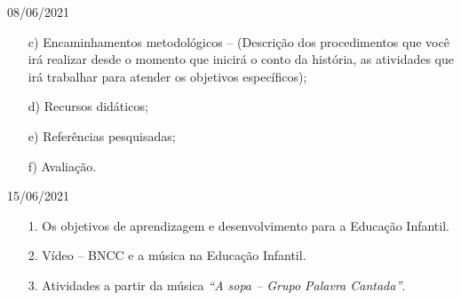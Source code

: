 \documentclass{SchoolBook}
\begin{document}
\begin{day}{08/06/2021}
\begin{enumerate}
            \item[c)] Encaminhamentos metodológicos -- (Descrição dos procedimentos que você irá realizar desde o momento que inicirá o conto da história, as atividades que irá trabalhar para atender os objetivos específicos);
            
            \item[d)] Recursos didáticos;
            \item[e)] Referências pesquisadas;
            \item[f)] Avaliação.
        \end{enumerate}
    \end{day}
    
    \begin{day}{15/06/2021}
        \begin{enumerate}
            \item[1.] Os objetivos de aprendizagem e desenvolvimento para a Educação Infantil.
            \item[2.] Vídeo -- BNCC e a música na Educação Infantil.
            \item[3.] Atividades a partir da música \emph{``A sopa -- Grupo Palavra Cantada''}.
        \end{enumerate}
    \end{day}
\end{document}
